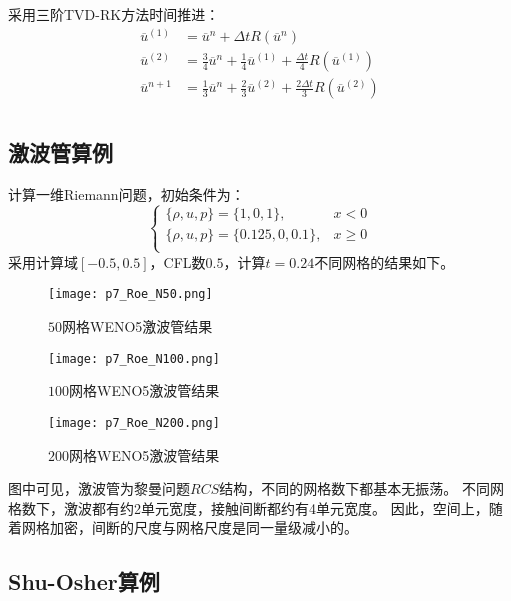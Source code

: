 \documentclass[UTF8,zihao=5]{ctexart} %
\newcommand*{\inc}[0]{{\Delta}}
\begin{document}
采用三阶TVD-RK方法\cite{gottlieb1998total}时间推进：
$$
    \begin{aligned}
        \overline{u}^{(1)} & = \overline{u}^n + {\inc t} R(\overline{u}^n)                                                        \\
        \overline{u}^{(2)} & = \frac{3}{4}\overline{u}^n +\frac{1}{4}\overline{u}^{(1)} + \frac{\inc t}{4} R(\overline{u}^{(1)})  \\
        \overline{u}^{n+1} & = \frac{1}{3}\overline{u}^n +\frac{2}{3}\overline{u}^{(2)} + \frac{2\inc t}{3} R(\overline{u}^{(2)}) \\
    \end{aligned}
$$

\subsection{激波管算例}

计算一维Riemann问题，初始条件为：
$$
    \left\{
    \begin{array}{ll}
        \{\rho,u,p\} = \{1,0,1\},       & x < 0    \\
        \{\rho,u,p\} = \{0.125,0,0.1\}, & x \geq 0 \\
    \end{array}
    \right.
$$
采用计算域$[-0.5,0.5]$，CFL数$0.5$，计算$t=0.24$不同网格的结果如下。

\begin{figure}[H]
    \centering
    \texttt{[image: p7\_Roe\_N50.png]}  %
    \caption{$50$网格WENO5激波管结果}
\end{figure}

\begin{figure}[H]
    \centering
    \texttt{[image: p7\_Roe\_N100.png]}  %
    \caption{$100$网格WENO5激波管结果}
\end{figure}

\begin{figure}[H]
    \centering
    \texttt{[image: p7\_Roe\_N200.png]}  %
    \caption{$200$网格WENO5激波管结果}
\end{figure}

图中可见，激波管为黎曼问题$RCS$结构，不同的网格数下都基本无振荡。
不同网格数下，激波都有约2单元宽度，接触间断都约有4单元宽度。
因此，空间上，随着网格加密，间断的尺度与网格尺度是同一量级减小的。

\subsection{Shu-Osher算例}
\end{document}
